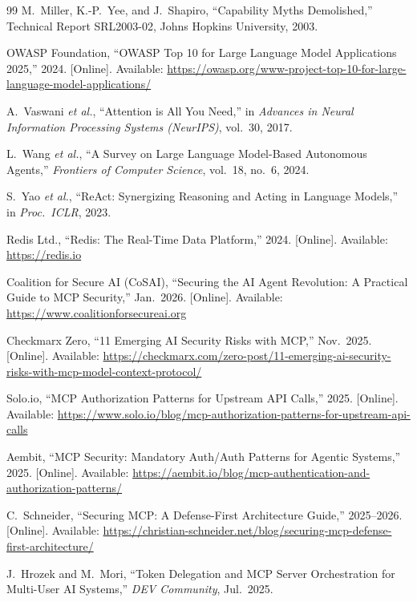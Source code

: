 \documentclass[journal]{IEEEtran}
\begin{document}
\begin{thebibliography}{99}
M.\ Miller, K.-P.\ Yee, and J.\ Shapiro,
``Capability Myths Demolished,''
Technical Report SRL2003-02, Johns Hopkins University, 2003.

OWASP Foundation,
``OWASP Top 10 for Large Language Model Applications 2025,'' 2024.
[Online]. Available:
\url{https://owasp.org/www-project-top-10-for-large-language-model-applications/}

A.\ Vaswani \textit{et al.},
``Attention is All You Need,''
in \textit{Advances in Neural Information Processing Systems (NeurIPS)},
vol.\ 30, 2017.

L.\ Wang \textit{et al.},
``A Survey on Large Language Model-Based Autonomous Agents,''
\textit{Frontiers of Computer Science}, vol.\ 18, no.\ 6, 2024.

S.\ Yao \textit{et al.},
``ReAct: Synergizing Reasoning and Acting in Language Models,''
in \textit{Proc.\ ICLR}, 2023.

Redis Ltd., ``Redis: The Real-Time Data Platform,'' 2024.
[Online]. Available: \url{https://redis.io}

Coalition for Secure AI (CoSAI),
``Securing the AI Agent Revolution: A Practical Guide to MCP Security,''
Jan.\ 2026.
[Online]. Available: \url{https://www.coalitionforsecureai.org}

Checkmarx Zero,
``11 Emerging AI Security Risks with MCP,'' Nov.\ 2025.
[Online]. Available:
\url{https://checkmarx.com/zero-post/11-emerging-ai-security-risks-with-mcp-model-context-protocol/}

Solo.io,
``MCP Authorization Patterns for Upstream API Calls,'' 2025.
[Online]. Available:
\url{https://www.solo.io/blog/mcp-authorization-patterns-for-upstream-api-calls}

Aembit,
``MCP Security: Mandatory Auth/Auth Patterns for Agentic Systems,'' 2025.
[Online]. Available:
\url{https://aembit.io/blog/mcp-authentication-and-authorization-patterns/}

C.\ Schneider,
``Securing MCP: A Defense-First Architecture Guide,'' 2025--2026.
[Online]. Available:
\url{https://christian-schneider.net/blog/securing-mcp-defense-first-architecture/}

J.\ Hrozek and M.\ Mori,
``Token Delegation and MCP Server Orchestration for Multi-User AI Systems,''
\textit{DEV Community}, Jul.\ 2025.


\end{thebibliography}
\end{document}
